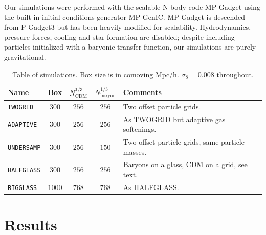 \documentclass[a4paper,11pt]{article}
\begin{document}
Our simulations were performed with the scalable N-body code MP-Gadget \cite{yu_feng_2018_1451799} using the built-in initial conditions generator MP-GenIC. MP-Gadget is descended from P-Gadget3 but has been heavily modified for scalability. Hydrodynamics, pressure forces, cooling and star formation are disabled; despite including particles initialized with a baryonic transfer function, our simulations are purely gravitational.

\begin{table}
\begin{center}
\begin{tabular}{|l|c|c|c|l|}
\hline
Name & Box & $N_\mathrm{CDM}^{1/3}$ & $N_\mathrm{baryon}^{1/3}$ & Comments  \\
\hline
\texttt{TWOGRID}    &   $300$ & $256$ & $256$ & Two offset particle grids. \\
\texttt{ADAPTIVE}    &   $300$ & $256$ & $256$ & As TWOGRID but adaptive gas softenings. \\
\texttt{UNDERSAMP}  &   $300$ & $256$ & $150$ & Two offset particle grids, same particle masses. \\
\texttt{HALFGLASS}  &   $300$ & $256$ & $256$ & Baryons on a glass, CDM on a grid, see text. \\
\texttt{BIGGLASS}  &   $1000$ & $768$ & $768$ & As HALFGLASS. \\
\hline
\end{tabular}
\end{center}
\caption{Table of simulations. Box size is in comoving Mpc/h. $\sigma_8 = 0.008$ throughout.}
\label{tab:simulations}
\end{table}

\section{Results}
\end{document}
